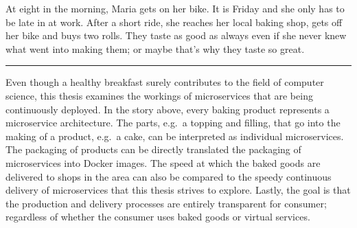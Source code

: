 At eight in the morning, Maria gets on her bike. It is Friday and she only has
to be late in at work. After a short ride, she reaches her local baking shop,
gets off her bike and buys two rolls. They taste as good as always even if she
never knew what went into making them; or maybe that's why they taste so great.

\rule{2cm}{0.4pt}

Even though a healthy breakfast surely contributes to the field of computer
science, this thesis examines the workings of microservices that are being
continuously deployed. In the story above, every baking product represents a
microservice architecture. The parts, e.g.\ a topping and filling, that go into
the making of a product, e.g.\ a cake, can be interpreted as individual
microservices. The packaging of products can be directly translated the
packaging of microservices into Docker images. The speed at which the baked
goods are delivered to shops in the area can also be compared to the speedy
continuous delivery of microservices that this thesis strives to explore.
Lastly, the goal is that the production and delivery processes are entirely
transparent for consumer; regardless of whether the consumer uses baked goods
or virtual services.


